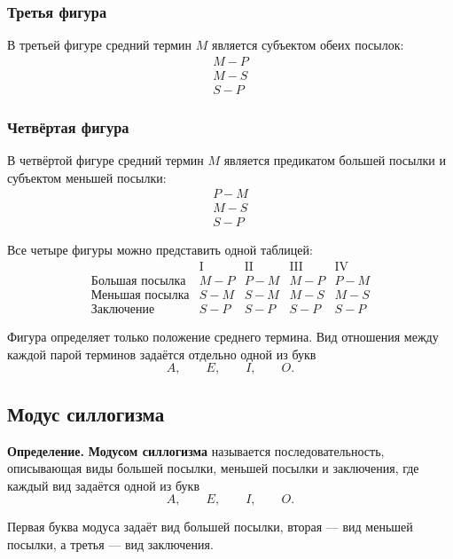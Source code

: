 \documentclass[12pt,a4paper,oneside,openany]{book}
\theoremstyle{definition}
\theoremstyle{plain}
\theoremstyle{remark}
\begin{document}
\subsubsection{Третья фигура}

В третьей фигуре средний термин \(M\) является субъектом обеих
посылок:
\[
\boxed{
\begin{array}{c}
M-P\\
M-S\\
\hline
S-P
\end{array}
}
\]

\subsubsection{Четвёртая фигура}

В четвёртой фигуре средний термин \(M\) является предикатом большей
посылки и субъектом меньшей посылки:
\[
\boxed{
\begin{array}{c}
P-M\\
M-S\\
\hline
S-P
\end{array}
}
\]

Все четыре фигуры можно представить одной таблицей:
\[
\begin{array}{c|c|c|c|c}
&
\text{I}
&
\text{II}
&
\text{III}
&
\text{IV}
\\
\hline
\text{Большая посылка}
&
M-P
&
P-M
&
M-P
&
P-M
\\[1mm]
\text{Меньшая посылка}
&
S-M
&
S-M
&
M-S
&
M-S
\\[1mm]
\hline
\text{Заключение}
&
S-P
&
S-P
&
S-P
&
S-P
\end{array}
\]

Фигура определяет только положение среднего термина. Вид отношения
между каждой парой терминов задаётся отдельно одной из букв
\[
A,\qquad E,\qquad I,\qquad O.
\]





\subsection{Модус силлогизма}

\textbf{Определение.}
\textbf{Модусом силлогизма} называется последовательность,
описывающая виды большей посылки, меньшей посылки и заключения, где
каждый вид задаётся одной из букв
\[
A,\qquad E,\qquad I,\qquad O.
\]

Первая буква модуса задаёт вид большей посылки, вторая --- вид
меньшей посылки, а третья --- вид заключения.
\end{document}
